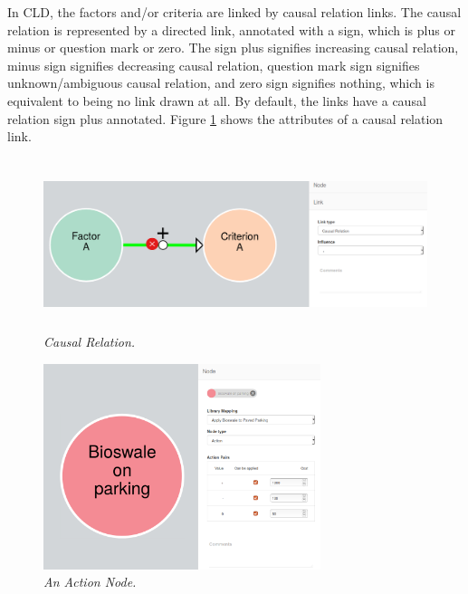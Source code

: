 \documentclass[a4paper]{article}
\begin{document}
In CLD, the factors and/or criteria are linked by causal relation links. The causal relation is represented by a directed link, annotated with a sign, which is plus or minus or question mark or zero. The sign plus signifies increasing causal relation, minus sign signifies decreasing causal relation, question mark sign signifies unknown/ambiguous causal relation, and zero sign signifies nothing, which is equivalent to being no link drawn at all. By default, the links have a causal relation sign plus annotated. Figure \ref{fig:links} shows the attributes of a causal relation link.

\begin{figure}
\begin{center}
\includegraphics[width=1.0\linewidth, height=5cm]{img/links.png}
\caption{\small \sl Causal Relation.\label{fig:links}}
\end{center}
\end{figure}

\begin{figure}
\begin{center}
\includegraphics[width=0.75\linewidth, height=6cm]{img/action.png}
\caption{\small \sl An Action Node.\label{fig:action}}
\end{center}
\end{figure}
\end{document}
